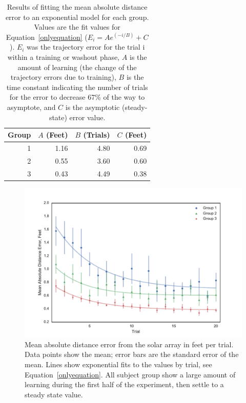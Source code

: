 \documentclass[]{aiaa-tc}%
\begin{document}
\begin{table}[tb!]
  \centering
  \begin{tabular}{rrrr}
    \toprule
    Group & $A$ (Feet) & $B$ (Trials) & $C$ (Feet) \\
    \midrule
    1     & 1.16       & 4.80         & 0.69       \\
    2     & 0.55       & 3.60         & 0.60       \\
    3     & 0.43       & 4.49         & 0.38       \\
    \bottomrule
  \end{tabular}
  \caption[Results of fitting the mean absolute distance error to an exponential model for each group]{Results of fitting the mean absolute distance error to an exponential model for each group. Values are the fit values for Equation~\ref{onlyequation} ($E_i = A e^{(-i/B)} + C$). $E_i$ was the trajectory error for the trial i within a training or washout phase, $A$ is the amount of learning (the change of the trajectory errors due to training), $B$ is the time constant indicating the number of trials for the error to decrease 67\% of the way to asymptote, and $C$ is the asymptotic (steady-state) error value.}
  \label{tab:dist_exp_fits}
\end{table}

\begin{figure}[tb!]
  \centering
  \includegraphics[width=0.8\linewidth]{figs/Group_absDistErr_clean_fit_30.pdf}
  \caption[Mean absolute distance error from the solar array per trial]{Mean absolute distance error from the solar array in feet per trial. Data points show the mean; error bars are the standard error of the mean. Lines show exponential fits to the values by trial, see Equation~\ref{onlyequation}. All subject group show a large amount of learning during the first half of the experiment, then settle to a steady state value.} \label{fig:performance}
\end{figure}
\end{document}
